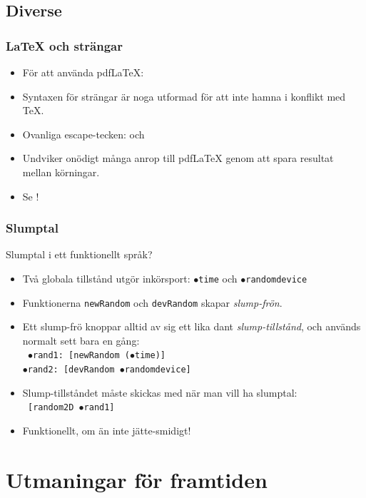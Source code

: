 \documentclass[noamsthm,handout]{beamer}
\begin{document}
\subsection{Diverse}
\begin{frame}\frametitle{\LaTeX{} och strängar}
  \begin{itemize}
  \item För att använda pdf\LaTeX{}:\\
  \item Syntaxen för strängar är noga utformad för att inte hamna i konflikt med \TeX{}.
  \item Ovanliga escape-tecken: \texttt{\cent} och \texttt{\currency}
  \item Undviker onödigt många anrop till pdf\LaTeX{} genom att spara resultat mellan körningar.
  \item Se !
  \end{itemize}
\end{frame}
\begin{frame}\frametitle{Slumptal}
  Slumptal i ett funktionellt språk?
  \begin{itemize}
  \item Två globala tillstånd utgör inkörsport: \texttt{$\bullet$time} och \texttt{$\bullet$randomdevice}
  \item Funktionerna \texttt{newRandom} och \texttt{devRandom} skapar \emph{slump-frön}.
  \item Ett slump-frö knoppar alltid av sig ett lika dant \emph{slump-tillstånd}, och används normalt sett bara en gång:\\
    \texttt{%
      $\bullet$rand1: [newRandom ($\bullet$time)]\\
      $\bullet$rand2: [devRandom $\bullet$randomdevice]
    }
  \item Slump-tillståndet måste skickas med när man vill ha slumptal:\\
    \texttt{%
      [random2D $\bullet$rand1]
    }
  \item Funktionellt, om än inte jätte-smidigt!
  \end{itemize}
\end{frame}

\section{Utmaningar för framtiden}
\end{document}
